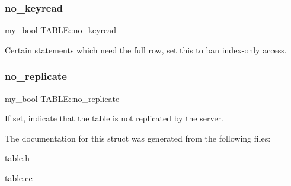 \subsubsection{\texorpdfstring{no\+\_\+keyread}{no\_keyread}}
{\footnotesize\ttfamily my\+\_\+bool T\+A\+B\+L\+E\+::no\+\_\+keyread}

Certain statements which need the full row, set this to ban index-\/only access. \mbox{\label{structTABLE_a5b99d728b08a795783c2a5b0a1c997f7}} 
\subsubsection{\texorpdfstring{no\+\_\+replicate}{no\_replicate}}
{\footnotesize\ttfamily my\+\_\+bool T\+A\+B\+L\+E\+::no\+\_\+replicate}

If set, indicate that the table is not replicated by the server. 

The documentation for this struct was generated from the following files\+:\begin{DoxyCompactItemize}
\item 
table.\+h\item 
table.\+cc\end{DoxyCompactItemize}
